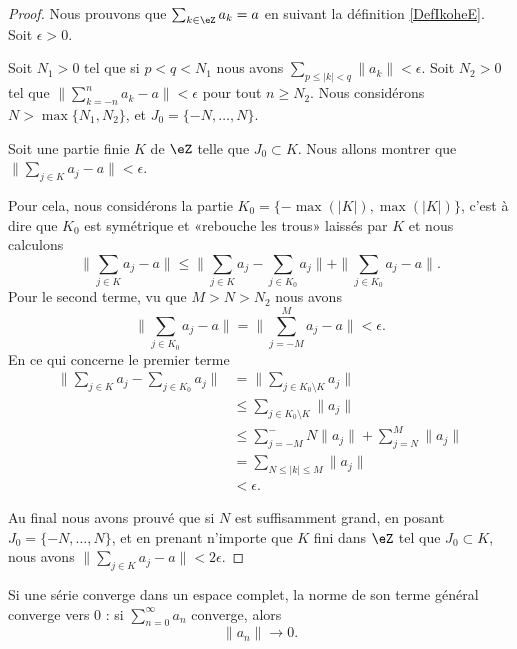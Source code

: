 \begin{proof}
	Nous prouvons que \( \sum_{k\in \eZ}a_k=a\) en suivant la définition \ref{DefIkoheE}. Soit \( \epsilon>0\).

	Soit \( N_1>0\) tel que si \( p<q<N_1\) nous avons \( \sum_{p\leq | k |<q}\| a_k \|<\epsilon\). Soit \( N_2>0\) tel que \( \| \sum_{k=-n}^{n}a_k-a \|<\epsilon\) pour tout \( n\geq N_2\). Nous considérons \( N>\max\{ N_1,N_2 \}\), et \( J_0=\{ -N,\ldots,N \}\).

	Soit une partie finie \( K\) de \( \eZ\) telle que \( J_0\subset K\). Nous allons montrer que \( \| \sum_{j\in K}a_j-a \|<\epsilon\).

	Pour cela, nous considérons la partie \( K_0=\{ -\max(| K |),\max(| K |) \}\), c'est à dire que \( K_0\) est symétrique et «rebouche les trous» laissés par \( K\) et nous calculons
	\begin{equation}
		\| \sum_{j\in K}a_j-a \|  \leq \| \sum_{j\in K}a_j-\sum_{j\in K_0}a_j \|+\| \sum_{j\in K_0}a_j-a \|.
	\end{equation}
	Pour le second terme, vu que \( M>N>N_2\) nous avons
	\begin{equation}
		\| \sum_{j\in K_0}a_j-a \|=\| \sum_{j=-M}^Ma_j-a \|<\epsilon.
	\end{equation}
	En ce qui concerne le premier terme
	\begin{subequations}
		\begin{align}
			\| \sum_{j\in K}a_j-\sum_{j\in K_0}a_j \| & =\| \sum_{j\in K_0\setminus K}a_j \|               \\
			                                          & \leq\sum_{j\in K_0\setminus K}\| a_j \|            \\
			                                          & \leq \sum_{j=-M}^-N\| a_j \|+\sum_{j=N}^M\| a_j \| \\
			                                          & =\sum_{N\leq | k |\leq M}\| a_j \|                 \\
			                                          & <\epsilon.
		\end{align}
	\end{subequations}

	Au final nous avons prouvé que si \( N\) est suffisamment grand, en posant \( J_0=\{ -N,\ldots,N \}\), et en prenant n'importe que \( K\) fini dans \( \eZ\) tel que \( J_0\subset K\), nous avons \( \| \sum_{j\in K}a_j-a \|<2\epsilon\).
\end{proof}

\begin{proposition}  \label{PROPooYDFUooTGnYQg}
	Si une série converge dans un espace complet, la norme de son terme général converge vers \( 0\) : si \( \sum_{n=0}^{\infty}a_n\) converge, alors
	\begin{equation}
		\| a_n \|\to 0.
	\end{equation}
\end{proposition}

